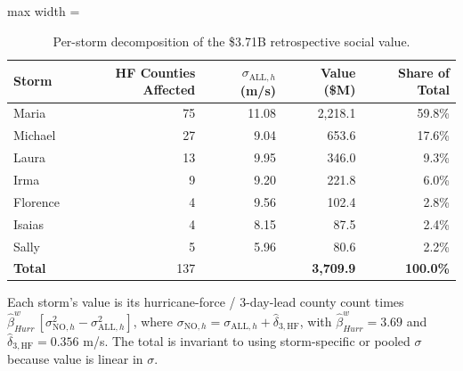 \begin{table}

\caption{Per-storm decomposition of the \$3.71B retrospective social value. \label{tab:per_storm}}
\centering
\begin{adjustbox}{max width = \textwidth}
\begin{threeparttable}
\begin{tabular}[t]{lrrrr}
\toprule
Storm & HF Counties Affected & $\sigma_{\text{ALL},h}$ (m/s) & Value (\$M) & Share of Total\\
\midrule
Maria & 75 & 11.08 & 2,218.1 & 59.8\%\\
Michael & 27 & 9.04 & 653.6 & 17.6\%\\
Laura & 13 & 9.95 & 346.0 & 9.3\%\\
Irma & 9 & 9.20 & 221.8 & 6.0\%\\
Florence & 4 & 9.56 & 102.4 & 2.8\%\\
Isaias & 4 & 8.15 & 87.5 & 2.4\%\\
Sally & 5 & 5.96 & 80.6 & 2.2\%\\
\textbf{Total} & 137 &  & \textbf{3,709.9} & \textbf{100.0\%}\\
\bottomrule
\end{tabular}
\begin{tablenotes}
\small
\item Each storm's value is its hurricane-force / 3-day-lead county count times $\hat{\beta}^w_{Hurr}\,[\sigma_{\text{NO},h}^2-\sigma_{\text{ALL},h}^2]$, where $\sigma_{\text{NO},h}=\sigma_{\text{ALL},h}+\hat{\delta}_{3,\text{HF}}$, with $\hat{\beta}^w_{Hurr}=3.69$ and $\hat{\delta}_{3,\text{HF}}=0.356$ m/s. The total is invariant to using storm-specific or pooled $\sigma$ because value is linear in $\sigma$.
\end{tablenotes}
\end{threeparttable}
\end{adjustbox}
\end{table}
